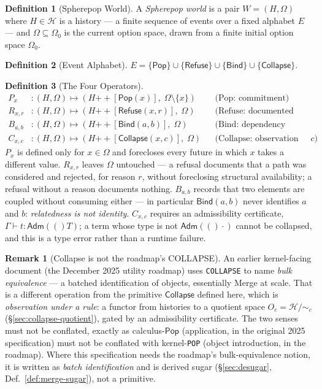 \documentclass[12pt]{article}
\newcommand{\Pop}{\mathsf{Pop}}
\theoremstyle{definition}
\newtheorem{definition}{Definition}
\newtheorem{remark}{Remark}
\newcommand{\RefuseOp}{\mathsf{Refuse}}
\newcommand{\CollapseOp}{\mathsf{Collapse}}
\newcommand{\BindOp}{\mathsf{Bind}}
\newcommand{\CalH}{\mathcal{H}}
\newcommand{\Adm}[1]{\mathsf{Adm}(#1)}
\newcommand{\OptZero}{\Omega_0}
\begin{document}
\begin{definition}[Spherepop World]
A \emph{Spherepop world} is a pair $W = (H, \Omega)$ where $H \in \CalH$ is a history — a finite sequence of events over a fixed alphabet $E$ — and $\Omega \subseteq \OptZero$ is the current option space, drawn from a finite initial option space $\OptZero$.
\end{definition}

\begin{definition}[Event Alphabet]
$E = \{\Pop\} \cup \{\RefuseOp\} \cup \{\BindOp\} \cup \{\CollapseOp\}$.
\end{definition}

\begin{definition}[The Four Operators]
\begin{align*}
P_x &: (H,\Omega) \mapsto (H \mathbin{{+}\!+} [\Pop(x)],\; \Omega\setminus\{x\}) & &\text{(Pop: commitment)}\\
R_{x,r} &: (H,\Omega) \mapsto (H \mathbin{{+}\!+} [\RefuseOp(x,r)],\; \Omega) & &\text{(Refuse: documented inadmissibility)}\\
B_{a,b} &: (H,\Omega) \mapsto (H \mathbin{{+}\!+} [\BindOp(a,b)],\; \Omega) & &\text{(Bind: dependency declaration)}\\
C_{x,c} &: (H,\Omega) \mapsto (H \mathbin{{+}\!+} [\CollapseOp(x,c)],\; \Omega) & &\text{(Collapse: observation under rule $c$)}
\end{align*}
$P_x$ is defined only for $x \in \Omega$ and forecloses every future in which $x$ takes a different value. $R_{x,r}$ leaves $\Omega$ untouched — a refusal documents that a path was considered and rejected, for reason $r$, without foreclosing structural availability; a refusal without a reason documents nothing. $B_{a,b}$ records that two elements are coupled without consuming either — in particular $\BindOp(a,b)$ never identifies $a$ and $b$: \emph{relatedness is not identity}. $C_{x,c}$ requires an admissibility certificate, $\Gamma \vdash t : \Adm(T)$; a term whose type is not $\Adm(\cdot)$ cannot be collapsed, and this is a type error rather than a runtime failure.
\end{definition}

\begin{remark}[Collapse is not the roadmap's COLLAPSE]
An earlier kernel-facing document (the December 2025 utility roadmap) uses \texttt{COLLAPSE} to name \emph{bulk equivalence} — a batched identification of objects, essentially Merge at scale. That is a different operation from the primitive $\CollapseOp$ defined here, which is \emph{observation under a rule}: a functor from histories to a quotient space $O_c = \CalH/{\sim_c}$ (\S\ref{sec:collapse-quotient}), gated by an admissibility certificate. The two senses must not be conflated, exactly as calculus-$\Pop$ (application, in the original 2025 specification) must not be conflated with kernel-\texttt{POP} (object introduction, in the roadmap). Where this specification needs the roadmap's bulk-equivalence notion, it is written as \emph{batch identification} and is derived sugar (\S\ref{sec:desugar}, Def.~\ref{def:merge-sugar}), not a primitive.
\end{remark}
\end{document}
